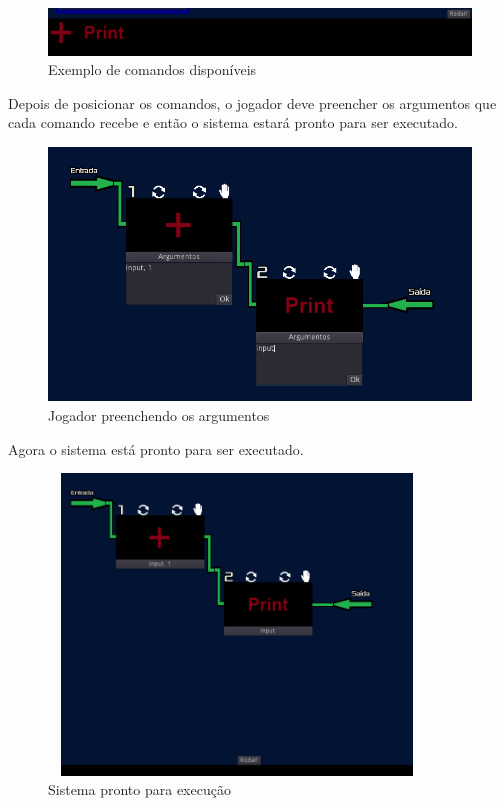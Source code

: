 \begin{figure}[H]
    \includegraphics[scale=0.5]{../figuras/exemplo_comandos.png}
    \caption{Exemplo de comandos disponíveis}
\end{figure}

Depois de posicionar os comandos, o jogador deve preencher os argumentos que 
cada comando recebe e então o sistema estará pronto para ser executado.

\begin{figure}[H]
    \includegraphics[width=\textwidth]{../figuras/preenchendo_argumentos.png}
    \caption{Jogador preenchendo os argumentos}
\end{figure}

Agora o sistema está pronto para ser executado.

\begin{figure}[H]
    \includegraphics[width=100mm, height=80mm]{../figuras/sistema_pronto.png}
    \caption{Sistema pronto para execu\c{c}\~{a}o}
\end{figure}

